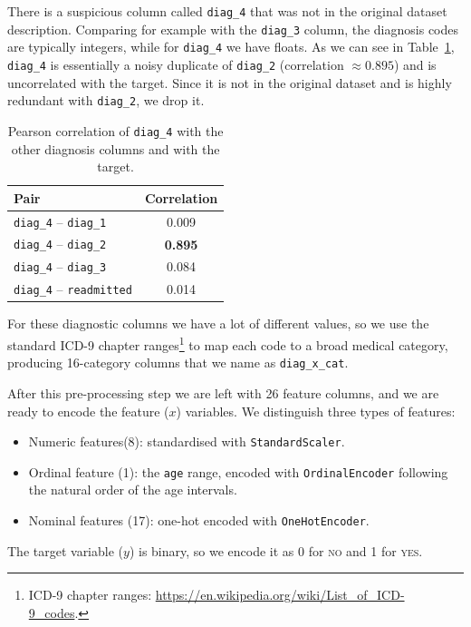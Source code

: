 \documentclass[11pt,a4paper]{article}
\begin{document}
There is a suspicious column called \texttt{diag\_4} that was not in the original dataset description.
Comparing for example with the \texttt{diag\_3} column, the diagnosis codes are typically integers, while for \texttt{diag\_4} we have floats.
As we can see in Table~\ref{tab:diag4-corr}, \texttt{diag\_4} is essentially a noisy duplicate of \texttt{diag\_2} (correlation $\approx 0.895$) and is uncorrelated with the target.
Since it is not in the original dataset and is highly redundant with \texttt{diag\_2}, we drop it.

\begin{table}[htbp]
\centering
\caption{Pearson correlation of \texttt{diag\_4} with the other diagnosis columns and with the target.}
\label{tab:diag4-corr}
\begin{tabular}{@{}lc@{}}
\toprule
\textbf{Pair} & \textbf{Correlation} \\
\midrule
\texttt{diag\_4} -- \texttt{diag\_1}     & 0.009 \\
\texttt{diag\_4} -- \texttt{diag\_2}     & \textbf{0.895} \\
\texttt{diag\_4} -- \texttt{diag\_3}     & 0.084 \\
\texttt{diag\_4} -- \texttt{readmitted}  & 0.014 \\
\bottomrule
\end{tabular}
\end{table}


For these diagnostic columns we have a lot of different values, so we use the standard ICD-9 chapter ranges\footnote{ICD-9 chapter ranges: \url{https://en.wikipedia.org/wiki/List_of_ICD-9_codes}.} to map each code to a broad medical category,
producing 16-category columns that we name as \texttt{diag\_x\_cat}.

After this pre-processing step we are left with 26 feature columns, and we are ready to encode
the feature ($x$) variables. We distinguish three types of features:

\begin{itemize}
    \item Numeric features(8): standardised with \texttt{StandardScaler}.
    \item Ordinal feature (1): the \texttt{age} range, encoded with \texttt{OrdinalEncoder} following the natural order of the age intervals.
    \item Nominal features (17): one-hot encoded with \texttt{OneHotEncoder}.
\end{itemize}

 The target variable ($y$) is
binary, so we encode it as 0 for \textsc{no} and 1 for \textsc{yes}.
\end{document}
